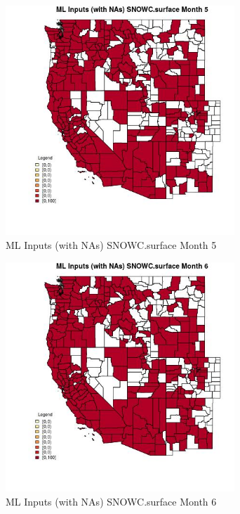 \begin{figure} 
\centering  
\includegraphics[width=0.77\textwidth]{Code_Outputs/Report_ML_input_PM25_Step4_part_e_de_duplicated_aves_compiled_2019-05-21wNAs_CountySNOWCsurfacemedianMonth5.jpg} 
\caption{\label{fig:Report_ML_input_PM25_Step4_part_e_de_duplicated_aves_compiled_2019-05-21wNAsCountySNOWCsurfacemedianMonth5}ML Inputs (with NAs) SNOWC.surface Month 5} 
\end{figure} 
 

\begin{figure} 
\centering  
\includegraphics[width=0.77\textwidth]{Code_Outputs/Report_ML_input_PM25_Step4_part_e_de_duplicated_aves_compiled_2019-05-21wNAs_CountySNOWCsurfacemedianMonth6.jpg} 
\caption{\label{fig:Report_ML_input_PM25_Step4_part_e_de_duplicated_aves_compiled_2019-05-21wNAsCountySNOWCsurfacemedianMonth6}ML Inputs (with NAs) SNOWC.surface Month 6} 
\end{figure} 
 

